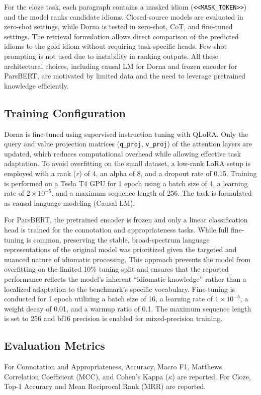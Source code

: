 \documentclass[11pt,a4paper]{article}
\begin{document}
For the cloze task, each paragraph contains a masked idiom (\texttt{<<MASK\_TOKEN>>}) and the model ranks candidate idioms. Closed-source models are evaluated in zero-shot settings, while Dorna is tested in zero-shot, CoT, and fine-tuned settings. The retrieval formulation allows direct comparison of the predicted idioms to the gold idiom without requiring task-specific heads. Few-shot prompting is not used due to instability in ranking outputs. All these architectural choices, including causal LM for Dorna and frozen encoder for ParsBERT, are motivated by limited data and the need to leverage pretrained knowledge efficiently.

\subsection{Training Configuration}
Dorna is fine-tuned using supervised instruction tuning with QLoRA. Only the query and value projection matrices (\texttt{q\_proj}, \texttt{v\_proj}) of the attention layers are updated, which reduces computational overhead while allowing effective task adaptation. To avoid overfitting on the small dataset, a low-rank LoRA setup is employed with a rank ($r$) of 4, an alpha of 8, and a dropout rate of 0.15. Training is performed on a Tesla T4 GPU for 1 epoch using a batch size of 4, a learning rate of $2 \times 10^{-5}$, and a maximum sequence length of 256. The task is formulated as causal language modeling (Causal LM).

For ParsBERT, the pretrained encoder is frozen and only a linear classification head is trained for the connotation and appropriateness tasks. While full fine-tuning is common, preserving the stable, broad-spectrum language representations of the original model was prioritized given the targeted and nuanced nature of idiomatic processing. This approach prevents the model from overfitting on the limited 10\% tuning split and ensures that the reported performance reflects the model's inherent ``idiomatic knowledge'' rather than a localized adaptation to the benchmark's specific vocabulary. Fine-tuning is conducted for 1 epoch utilizing a batch size of 16, a learning rate of $1 \times 10^{-5}$, a weight decay of 0.01, and a warmup ratio of 0.1. The maximum sequence length is set to 256 and bf16 precision is enabled for mixed-precision training.

\subsection{Evaluation Metrics}
For Connotation and Appropriateness, Accuracy, Macro F1, Matthews Correlation Coefficient (MCC), and Cohen’s Kappa ($\kappa$) are reported. For Cloze, Top-1 Accuracy and Mean Reciprocal Rank (MRR) are reported.
\end{document}

